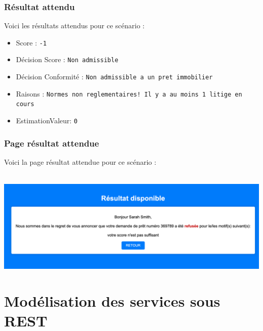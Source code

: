 \documentclass{article}
\begin{document}
    \subsubsection{Résultat attendu}
    Voici les résultats attendus pour ce scénario :
    \begin{itemize}
        \item Score : \texttt{-1}
        \item Décision Score : \texttt{Non admissible}
        \item Décision Conformité : \texttt{Non admissible a un pret immobilier}
        \item Raisons : \texttt{Normes non reglementaires! Il y a au moins 1 litige en cours}
        \item EstimationValeur: \texttt{0}
    \end{itemize}
    
    
    \subsubsection{Page résultat attendue}
    Voici la page résultat attendue pour ce scénario : \\
    \\
    \begin{center}
    \includegraphics[width=400pt]{Images/9.2/reponseN.png}\\
    \end{center}
      

\newpage





\section{Modélisation des services sous REST}
\end{document}
